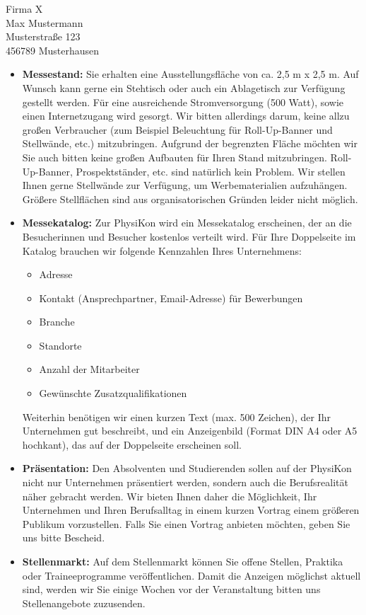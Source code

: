\documentclass[
  pepbrief,
  fontsize=12pt,
  paper=a4,
  DIV=14,
  parskip=half,
  backaddress=false,
]{scrlttr2}
\begin{document}
\begin{letter}{%
  Firma X\\
  Max Mustermann\\
  Musterstraße 123\\
  456789 Musterhausen

}
\begin{itemize}
  \item \textbf{Messestand:} Sie erhalten eine Ausstellungsfläche von ca. 2,5 m x 2,5 m.
    Auf Wunsch kann gerne ein Stehtisch oder auch ein Ablagetisch zur Verfügung gestellt werden.
    Für eine ausreichende Stromversorgung (500 Watt), sowie einen Internetzugang wird gesorgt.
    Wir bitten allerdings darum, keine allzu großen Verbraucher (zum Beispiel Beleuchtung für Roll-Up-Banner und Stellwände, etc.) mitzubringen.
    Aufgrund der begrenzten Fläche möchten wir Sie auch bitten keine großen Aufbauten für Ihren Stand mitzubringen.
    Roll-Up-Banner, Prospektständer, etc. sind natürlich kein Problem.
    Wir stellen Ihnen gerne Stellwände zur Verfügung, um Werbematerialien aufzuhängen.
    Größere Stellflächen sind aus organisatorischen Gründen leider nicht möglich.
    \item \textbf{Messekatalog:} Zur PhysiKon wird ein Messekatalog erscheinen, der an die Besucherinnen und Besucher kostenlos verteilt wird.
    Für Ihre Doppelseite im Katalog brauchen wir folgende Kennzahlen Ihres Unternehmens:
    \begin{itemize}
      \item Adresse
      \item Kontakt (Ansprechpartner, Email-Adresse) für Bewerbungen
      \item Branche
      \item Standorte
      \item Anzahl der Mitarbeiter
      \item Gewünschte Zusatzqualifikationen
    \end{itemize}
    Weiterhin benötigen wir einen kurzen Text (max. 500 Zeichen), der Ihr Unternehmen gut beschreibt, und ein Anzeigenbild (Format DIN A4 oder A5 hochkant), das auf der Doppelseite erscheinen soll.
    \item \textbf{Präsentation:} Den Absolventen und Studierenden sollen auf der PhysiKon nicht nur Unternehmen präsentiert werden, sondern auch die Berufsrealität näher gebracht werden.
    Wir bieten Ihnen daher die Möglichkeit, Ihr Unternehmen und Ihren Berufsalltag in einem kurzen Vortrag einem größeren Publikum vorzustellen.
    Falls Sie einen Vortrag anbieten möchten, geben Sie uns bitte Bescheid.
    \item \textbf{Stellenmarkt:} Auf dem Stellenmarkt können Sie offene Stellen, Praktika oder Traineeprogramme veröffentlichen. Damit die Anzeigen möglichst aktuell sind,
    werden wir Sie einige Wochen vor der Veranstaltung bitten uns Stellenangebote zuzusenden.

\end{itemize}
\end{letter}
\end{document}
